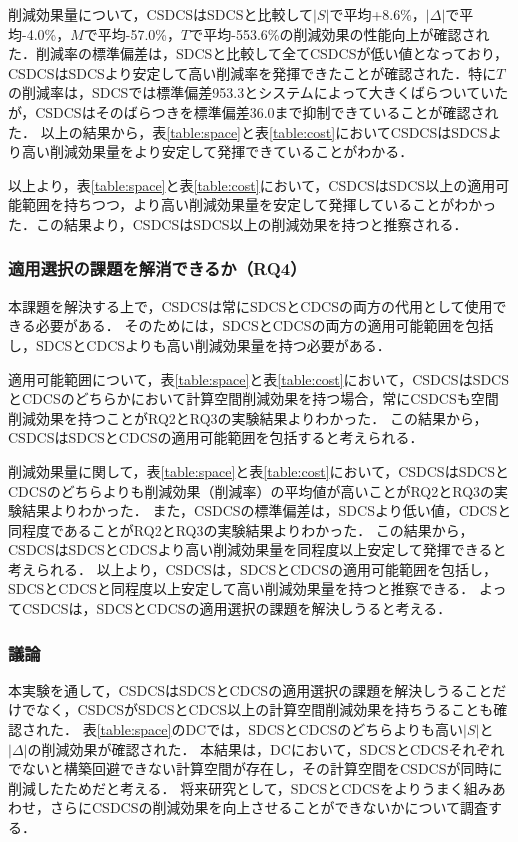 削減効果量について，CSDCSはSDCSと比較して$|S|$で平均+8.6\%，$|\Delta|$で平均-4.0\%，$M$で平均-57.0\%，$T$で平均-553.6\%の削減効果の性能向上が確認された．削減率の標準偏差は，SDCSと比較して全てCSDCSが低い値となっており，CSDCSはSDCSより安定して高い削減率を発揮できたことが確認された．特に$T$の削減率は，SDCSでは標準偏差953.3とシステムによって大きくばらついていたが，CSDCSはそのばらつきを標準偏差36.0まで抑制できていることが確認された．
以上の結果から，表\ref{table:space}と表\ref{table:cost}においてCSDCSはSDCSより高い削減効果量をより安定して発揮できていることがわかる．

以上より，表\ref{table:space}と表\ref{table:cost}において，CSDCSはSDCS以上の適用可能範囲を持ちつつ，より高い削減効果量を安定して発揮していることがわかった．この結果より，CSDCSはSDCS以上の削減効果を持つと推察される．

\subsubsection{適用選択の課題を解消できるか（RQ4）}
本課題を解決する上で，CSDCSは常にSDCSとCDCSの両方の代用として使用できる必要がある．
そのためには，SDCSとCDCSの両方の適用可能範囲を包括し，SDCSとCDCSよりも高い削減効果量を持つ必要がある．

適用可能範囲について，表\ref{table:space}と表\ref{table:cost}において，CSDCSはSDCSとCDCSのどちらかにおいて計算空間削減効果を持つ場合，常にCSDCSも空間削減効果を持つことがRQ2とRQ3の実験結果よりわかった．
この結果から，CSDCSはSDCSとCDCSの適用可能範囲を包括すると考えられる．

削減効果量に関して，表\ref{table:space}と表\ref{table:cost}において，CSDCSはSDCSとCDCSのどちらよりも削減効果（削減率）の平均値が高いことがRQ2とRQ3の実験結果よりわかった．
また，CSDCSの標準偏差は，SDCSより低い値，CDCSと同程度であることがRQ2とRQ3の実験結果よりわかった．
この結果から，CSDCSはSDCSとCDCSより高い削減効果量を同程度以上安定して発揮できると考えられる．
以上より，CSDCSは，SDCSとCDCSの適用可能範囲を包括し，SDCSとCDCSと同程度以上安定して高い削減効果量を持つと推察できる．
よってCSDCSは，SDCSとCDCSの適用選択の課題を解決しうると考える．


\subsubsection{議論}
本実験を通して，CSDCSはSDCSとCDCSの適用選択の課題を解決しうることだけでなく，CSDCSがSDCSとCDCS以上の計算空間削減効果を持ちうることも確認された．
表\ref{table:space}のDCでは，SDCSとCDCSのどちらよりも高い$|S|$と$|\Delta|$の削減効果が確認された．
本結果は，DCにおいて，SDCSとCDCSそれぞれでないと構築回避できない計算空間が存在し，その計算空間をCSDCSが同時に削減したためだと考える．
将来研究として，SDCSとCDCSをよりうまく組みあわせ，さらにCSDCSの削減効果を向上させることができないかについて調査する．

